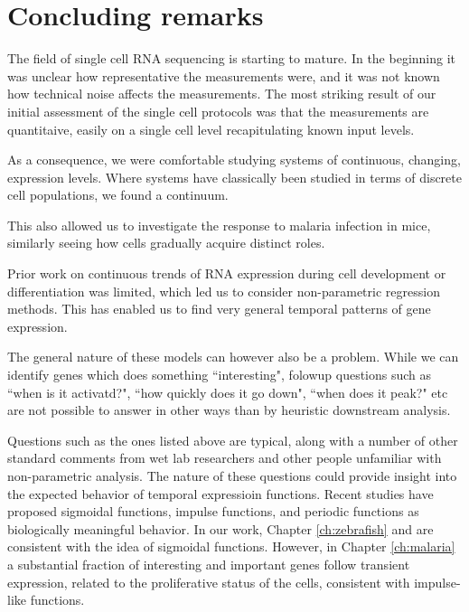 
\chapter{Concluding remarks}

The field of single cell RNA sequencing is starting to mature. In the beginning it was unclear how representative the measurements were, and it was not known how technical noise affects the measurements. The most striking result of our initial assessment of the single cell protocols was that the measurements are quantitaive, easily on a single cell level recapitulating known input levels.

As a consequence, we were comfortable studying systems of continuous, changing, expression levels. Where systems have classically been studied in terms of discrete cell populations, we found a continuum.

This also allowed us to investigate the response to malaria infection in mice, similarly seeing how cells gradually acquire distinct roles.

Prior work on continuous trends of RNA expression during cell development or differentiation was limited, which led us to consider non-parametric regression methods. This has enabled us to find very general temporal patterns of gene expression.

The general nature of these models can however also be a problem. While we can identify genes which does something ``interesting", folowup questions such as ``when is it activatd?", ``how quickly does it go down", ``when does it peak?" etc are not possible to answer in other ways than by heuristic downstream analysis.

Questions such as the ones listed above are typical, along with a number of other standard comments from wet lab researchers and other people unfamiliar with non-parametric analysis. The nature of these questions could provide insight into the expected behavior of temporal expressioin functions. Recent studies have proposed sigmoidal functions, impulse functions, and periodic functions as biologically meaningful behavior. In our work, Chapter \ref{ch:zebrafish} and \cite{Eckersley-Maslin2016-cz} are consistent with the idea of sigmoidal functions. However, in Chapter \ref{ch:malaria} a substantial fraction of interesting and important genes follow transient expression, related to the proliferative status of the cells, consistent with impulse-like functions.

